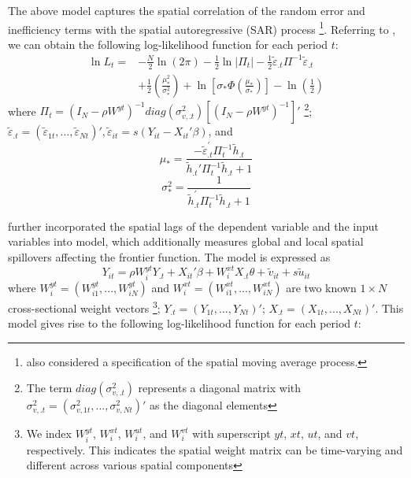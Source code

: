  The above model captures the spatial correlation of  the random error and inefficiency terms with the spatial autoregressive (SAR) process \footnote{\cite{orea2019new} also considered a specification of the spatial moving average process.}.  Referring to \cite{wang2010estimating}, we can obtain the following log-likelihood function for each period $t$:
 \begin{equation}\label{eq5}
 	\begin{aligned}
 		\ln L_{t}= & -\frac{N}{2} \ln (2 \pi)-\frac{1}{2} \ln |\Pi_t|-\frac{1}{2} \tilde{\varepsilon}_{.t} \Pi^{-1} \tilde{\varepsilon}_{.t} \\
 		& +\frac{1}{2}\left(\frac{\mu_{*}^{2}}{\sigma_{*}^{2}}\right)+\ln \left[\sigma_{*} \Phi\left(\frac{\mu_{*}}{\sigma_{*}}\right)\right]-\ln \left(\frac{1}{2} \right)
 	\end{aligned}
 \end{equation}
 where $\Pi_t=(I_N-\rho W^{yt})^{-1}diag(\sigma_{v,.t}^2)[(I_N-\rho W^{yt})^{-1}]'$ \footnote{The term $diag(\sigma_{v,.t}^2)$ represents a diagonal matrix with $\sigma_{v,.t}^2=(\sigma_{v,1t}^2,...,\sigma_{v,Nt}^2)'$ as the diagonal elements}; $ \tilde{\varepsilon}_{.t} = ( \tilde{\varepsilon}_{1t},..., \tilde{\varepsilon}_{Nt})', \tilde{\varepsilon}_{it}=s(Y_{it}-X_{it}' \beta)$, and 
 \begin{equation}
 	\mu_*  =\frac{-\tilde{\varepsilon}_{.t}^{\prime} \Pi_{t}^{-1} \tilde{h}_{.t}}{\tilde{h}_{.t}' \Pi_{t}^{-1} \tilde{h}_{.t}+1}
 \end{equation}
 \begin{equation}
 	\sigma_*^2  =\frac{1}{\tilde{h}_{.t}^{\prime} \Pi_{t}^{-1} \tilde{h}_{.t}+1 }
 \end{equation}
 
 
\cite{galli2022spatial} further incorporated the spatial lags of the dependent variable and the input variables into \cite{orea2019new} model, which additionally measures global and local spatial spillovers affecting the frontier function.  The model is expressed as
\begin{equation}\label{gallimodel}
	Y_{it} = \rho W_{i}^{yt}Y_{.t}+X_{it}'\beta+ W_{i}^{xt}X_{.t} \theta + \tilde{v}_{it}+s\tilde{u}_{it}
\end{equation}
where $W_{i}^{yt}=(W_{i1}^{yt},...,W_{iN}^{yt})$ and $W_{i}^{xt}=(W_{i1}^{xt},...,W_{iN}^{xt})$ are two known $1 \times N$ cross-sectional weight vectors \footnote{We index $W_{i}^{yt}$, $W_{i}^{xt}$, $W_{i}^{ut}$, and $W_{i}^{vt}$ with superscript $yt$, $xt$, $ut$, and $vt$, respectively. This indicates the spatial weight matrix can be time-varying and different across various spatial components}; $Y_{.t} = (Y_{1t},..., Y_{Nt})'$; $X_{.t} = (X_{1t},..., X_{Nt})'$.  This model gives rise to the following log-likelihood function for each period $t$: 

